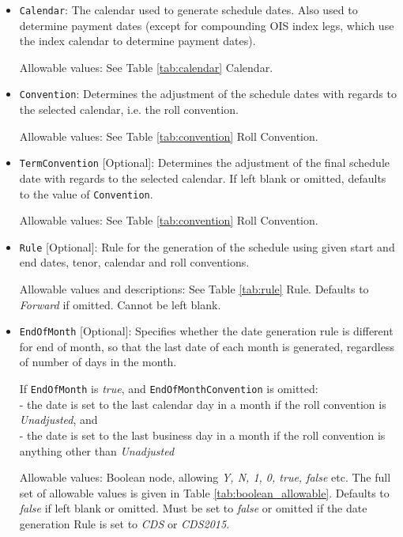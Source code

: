 \begin{itemize}
\item \lstinline!Calendar!: The calendar used to generate schedule  dates. Also used to determine payment dates (except for compounding OIS index legs, which use the index calendar to determine payment dates).

Allowable values: See Table \ref{tab:calendar} Calendar.

\item \lstinline!Convention!: Determines the adjustment of the schedule dates with
  regards to the selected calendar, i.e. the roll convention. 

Allowable values: See Table \ref{tab:convention} Roll Convention.

\item \lstinline!TermConvention! [Optional]: Determines the adjustment of the final schedule
  date with regards to the selected calendar. If left blank or omitted, defaults to the value of \lstinline!Convention!.

Allowable values: See Table \ref{tab:convention} Roll Convention.

\item \lstinline!Rule! [Optional]: Rule for the generation of the schedule using given
  start and end dates, tenor, calendar and roll conventions. 

Allowable values and descriptions: See Table \ref{tab:rule} Rule. Defaults to \emph{Forward} if omitted. Cannot be left blank.

\item \lstinline!EndOfMonth! [Optional]: Specifies whether the date generation rule is different for end of month, so that the last date of each month is generated, regardless of number of days in the month.

If \lstinline!EndOfMonth! is \emph{true}, and \lstinline!EndOfMonthConvention! is omitted:\\
- the date is set to the last calendar day in a month if the roll convention is \emph{Unadjusted}, and \\
- the date is set to the last business day in a month if the roll convention is anything other than \emph{Unadjusted}

Allowable values: Boolean node, allowing \emph{Y, N, 1, 0, true, false} etc. The full set of allowable values is given in Table \ref{tab:boolean_allowable}. Defaults to \emph{false} if left blank or omitted. Must be set to \emph{false} or omitted if the date generation Rule is set to \emph{CDS} or \emph{CDS2015}.


\end{itemize}

